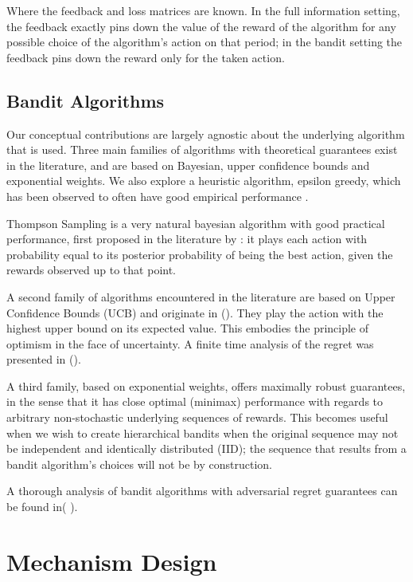 Where the feedback and loss matrices are known. In the full information setting, the feedback exactly pins down the value of the reward of the algorithm for any possible choice of the algorithm's action on that period; in the bandit setting the feedback pins down the reward only for the taken action.


\subsection{Bandit Algorithms}

Our conceptual contributions are largely agnostic about the underlying algorithm that is used.
Three main families of algorithms with theoretical guarantees exist in the literature, and are based on Bayesian, upper confidence bounds and exponential weights. We also explore a  heuristic algorithm, epsilon greedy, which has been observed to often have good empirical performance \cite{kuleshov:14}.

Thompson Sampling is a very natural bayesian algorithm with good practical performance, first proposed in the literature by \cite{thompson:33}: it plays each action with probability equal to its posterior probability of being the best action, given the rewards observed up to that point.

A second family of algorithms encountered in the literature are based on Upper Confidence Bounds (UCB) and originate in (\cite{lai:85,katehakis1995sequential,agrawal1995sample}). They play the action with the highest upper bound on its expected value. This embodies the principle of optimism in the face of uncertainty. A finite time analysis of the regret was presented in (\cite{auer:02a}).

A third family, based on exponential weights, offers maximally robust guarantees, in the sense that it has close optimal (minimax) performance with regards to arbitrary non-stochastic underlying sequences of rewards. This becomes useful when we wish to create hierarchical bandits when the original sequence may not be independent and identically distributed (IID); the sequence that results from a bandit algorithm's choices will not be by construction.

A thorough analysis of bandit algorithms with adversarial regret guarantees can be found in( \cite{bubeck:12, banditalgo2016}). 

\section{Mechanism Design}

